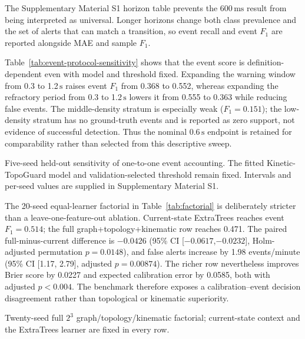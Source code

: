 \documentclass[final,5p,times,twocolumn]{elsarticle}
\newcommand{\SI}[2]{#1\,\ensuremath{\mathrm{#2}}}
\begin{document}
The Supplementary Material S1 horizon table prevents the \SI{600}{ms} result from being
interpreted as universal. Longer horizons change both class prevalence and the set of
alerts that can match a transition, so event recall and event $F_1$ are reported alongside
MAE and sample $F_1$.

Table~\ref{tab:event-protocol-sensitivity} shows that the event score is definition-
dependent even with model and threshold fixed. Expanding the warning window from 0.3 to
\SI{1.2}{s} raises event $F_1$ from 0.368 to 0.552, whereas expanding the refractory
period from 0.3 to \SI{1.2}{s} lowers it from 0.555 to 0.363 while reducing false events.
The middle-density stratum is especially weak ($F_1=0.151$); the low-density stratum has
no ground-truth events and is reported as zero support, not evidence of successful
detection. Thus the nominal \SI{0.6}{s} endpoint is retained for comparability rather than
selected from this descriptive sweep.

\begin{table}[t]
\centering
\caption{Five-seed held-out sensitivity of one-to-one event accounting. The fitted
Kinetic-TopoGuard model and validation-selected threshold remain fixed. Intervals and
per-seed values are supplied in Supplementary Material S1.}
\label{tab:event-protocol-sensitivity}
\small
\begin{adjustbox}{width=\textwidth}

\end{adjustbox}
\end{table}

The 20-seed equal-learner factorial in Table~\ref{tab:factorial} is deliberately stricter
than a leave-one-feature-out ablation. Current-state ExtraTrees reaches event $F_1=0.514$;
the full graph+topology+kinematic row reaches 0.471. The paired full-minus-current difference
is $-0.0426$ (95\% CI [$-0.0617$,$-0.0232$], Holm-adjusted permutation $p=0.0148$), and
false alerts increase by 1.98 events/minute (95\% CI [1.17, 2.79], adjusted $p=0.00874$).
The richer row nevertheless improves Brier score by 0.0227 and expected calibration error
by 0.0585, both with adjusted $p<0.004$. The benchmark therefore exposes a calibration--event
decision disagreement rather than topological or kinematic superiority.

\begin{table}[t]
\centering
\caption{Twenty-seed full $2^3$ graph/topology/kinematic factorial; current-state context
and the ExtraTrees learner are fixed in every row.}
\label{tab:factorial}
\begin{adjustbox}{width=\linewidth}

\end{adjustbox}
\end{table}
\end{document}
